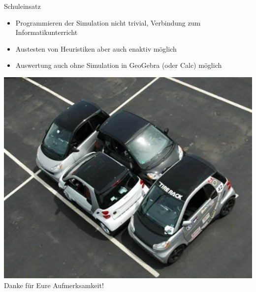 \documentclass[11pt]{beamer}
\begin{document}
\begin{frame}{Schuleinsatz}
\begin{itemize}
	\item Programmieren der Simulation nicht trivial, Verbindung zum Informatikunterricht
	\item Austesten von Heuristiken aber auch enaktiv möglich
	\item Auswertung auch ohne Simulation in GeoGebra (oder Calc) möglich 
\end{itemize}
\end{frame}

\begin{frame}
\begin{center}
\includegraphics[scale = 0.25]{quer_parken_1.jpg}\\
Danke für Eure Aufmerksamkeit!
\end{center}
\end{frame}
\end{document}
